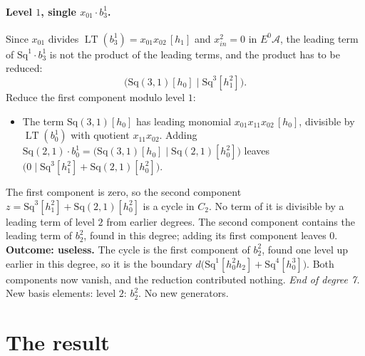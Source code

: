 \documentclass[11pt]{article}
\newcommand{\Sq}{\mathrm{Sq}}
\DeclareMathOperator{\LT}{LT}
\begin{document}
\paragraph{Level $1$, single $x_{01}\cdot b^{1}_{3}$.} Since $x_{01}$ divides $\LT(b^{1}_{3}) = x_{01}x_{02}\,[h_1]$ and $x_{in}^2 = 0$ in $E^0\mathcal A$, the leading term of $\Sq^{1}\cdot b^{1}_{3}$ is not the product of the leading terms, and the product has to be reduced:
\[\bigl(\Sq(3,1)[h_0] \;\big|\; \Sq^{3}[h_1^2]\bigr).\]
Reduce the first component modulo level $1$:
\begin{itemize}
\item The term $\Sq(3,1)[h_0]$ has leading monomial $x_{01}x_{11}x_{02}\,[h_0]$, divisible by $\LT(b^{1}_{0})$ with quotient $x_{11}x_{02}$. Adding $\Sq(2,1)\cdot b^{1}_{0} = \bigl(\Sq(3,1)[h_0] \;\big|\; \Sq(2,1)[h_0^2]\bigr)$ leaves $\bigl(0 \;\big|\; \Sq^{3}[h_1^2] + \Sq(2,1)[h_0^2]\bigr)$.
\end{itemize}
The first component is zero, so the second component $z = \Sq^{3}[h_1^2] + \Sq(2,1)[h_0^2]$ is a cycle in $C_{2}$.
No term of it is divisible by a leading term of level $2$ from earlier degrees.
The second component contains the leading term of $b^{2}_{2}$, found in this degree; adding its first component leaves $0$.
\textbf{Outcome: useless.} The cycle is the first component of $b^{2}_{2}$, found one level up earlier in this degree, so it is the boundary $d\bigl(\Sq^{1}[h_0^2h_2] + \Sq^{4}[h_0^3]\bigr)$. Both components now vanish, and the reduction contributed nothing.
\medskip\noindent\emph{End of degree 7.} New basis elements: level $2$: $b^{2}_{2}$. No new generators.

\section{The result}
\end{document}
